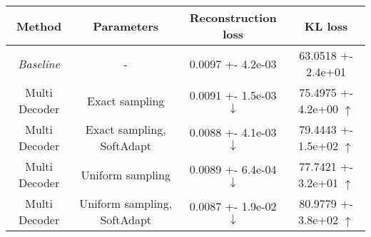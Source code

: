 \centering
\scriptsize
\begin{tabular}{||c|c|c|c||}
\hline
 Method & Parameters & Reconstruction loss & KL loss \\
\hline
\textit{Baseline} & - & 0.0097 +- 4.2e-03 & 63.0518 +- 2.4e+01 \\
\hline
Multi Decoder & Exact sampling & 0.0091 +- 1.5e-03  $\downarrow$ & 75.4975 +- 4.2e+00  $\uparrow$ \\
\hline
Multi Decoder & Exact sampling, SoftAdapt & 0.0088 +- 4.1e-03  $\downarrow$ & 79.4443 +- 1.5e+02  $\uparrow$ \\
\hline
Multi Decoder & Uniform sampling & 0.0089 +- 6.4e-04  $\downarrow$ & 77.7421 +- 3.2e+01  $\uparrow$ \\
\hline
Multi Decoder & Uniform sampling, SoftAdapt & 0.0087 +- 1.9e-02  $\downarrow$ & 80.9779 +- 3.8e+02  $\uparrow$ \\
\hline
\end{tabular}
